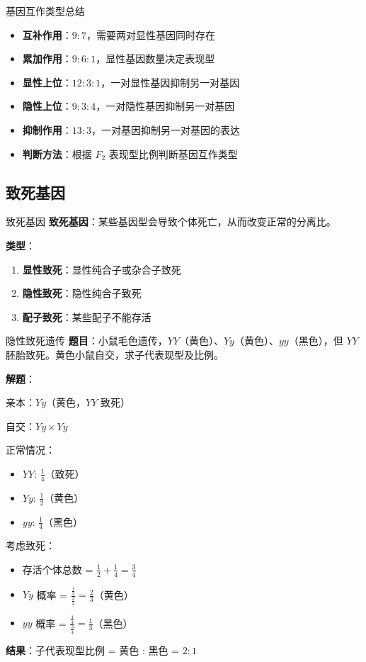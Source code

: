 \documentclass[a4paper,11pt]{ctexart}
\begin{document}
\begin{lemmabox}{基因互作类型总结}
\begin{itemize}[leftmargin=2em]
    \item \textbf{互补作用}：$9:7$，需要两对显性基因同时存在
    \item \textbf{累加作用}：$9:6:1$，显性基因数量决定表现型
    \item \textbf{显性上位}：$12:3:1$，一对显性基因抑制另一对基因
    \item \textbf{隐性上位}：$9:3:4$，一对隐性基因抑制另一对基因
    \item \textbf{抑制作用}：$13:3$，一对基因抑制另一对基因的表达
    \item \textbf{判断方法}：根据 $F_2$ 表现型比例判断基因互作类型
\end{itemize}
\end{lemmabox}

\subsection{致死基因}

\begin{definitionbox}{致死基因}
\textbf{致死基因}：某些基因型会导致个体死亡，从而改变正常的分离比。

\textbf{类型}：
\begin{enumerate}[leftmargin=2em]
    \item \textbf{显性致死}：显性纯合子或杂合子致死
    \item \textbf{隐性致死}：隐性纯合子致死
    \item \textbf{配子致死}：某些配子不能存活
\end{enumerate}
\end{definitionbox}

\begin{examplebox}{隐性致死遗传}
\textbf{题目}：小鼠毛色遗传，$YY$（黄色）、$Yy$（黄色）、$yy$（黑色），但 $YY$ 胚胎致死。黄色小鼠自交，求子代表现型及比例。

\textbf{解题}：

亲本：$Yy$（黄色，$YY$ 致死）

自交：$Yy \times Yy$

正常情况：
\begin{itemize}[leftmargin=2em]
    \item $YY$: $\frac{1}{4}$（致死）
    \item $Yy$: $\frac{1}{2}$（黄色）
    \item $yy$: $\frac{1}{4}$（黑色）
\end{itemize}

考虑致死：
\begin{itemize}[leftmargin=2em]
    \item 存活个体总数 = $\frac{1}{2} + \frac{1}{4} = \frac{3}{4}$
    \item $Yy$ 概率 = $\frac{\frac{1}{2}}{\frac{3}{4}} = \frac{2}{3}$（黄色）
    \item $yy$ 概率 = $\frac{\frac{1}{4}}{\frac{3}{4}} = \frac{1}{3}$（黑色）
\end{itemize}

\textbf{结果}：子代表现型比例 = 黄色 : 黑色 = $2:1$
\end{examplebox}
\end{document}
